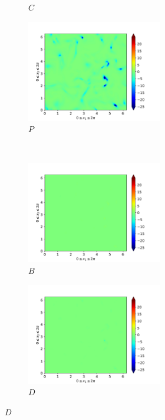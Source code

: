 \begin{figure}[H]
\begin{subfigure}{0.45\textwidth}
        \caption{$C$}
    \end{subfigure}
    \newline
    \begin{subfigure}{0.45\textwidth}
        \includegraphics[height=1.75in]{media/run-cds-65/P-ke-1330}
        \caption{$P$}
    \end{subfigure}
    ~
    \begin{subfigure}{0.45\textwidth}
        \includegraphics[height=1.75in]{media/run-cds-65/B-ke-1330}
        \caption{$B$}
    \end{subfigure}
    \newline
    \begin{subfigure}{0.45\textwidth}
        \includegraphics[height=1.75in]{media/run-cds-65/D-ke-1330}
        \caption{$D$}
    \end{subfigure}
\end{figure}

\newpage

